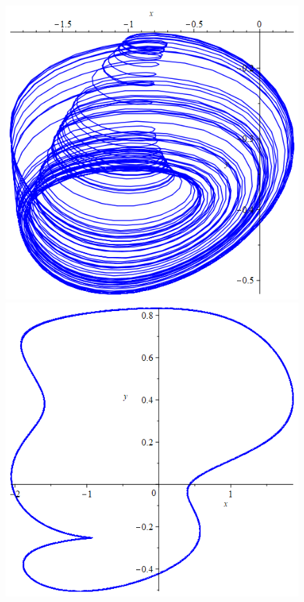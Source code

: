 \documentclass[10pt,a4paper]{article}
\begin{document}
\begin{figure}[h]
		{\includegraphics[scale=0.2]{Lab3 f=0.745}}
		{\includegraphics[scale=0.2]{Lab3 f=0.8}}

\end{figure}
\end{document}
